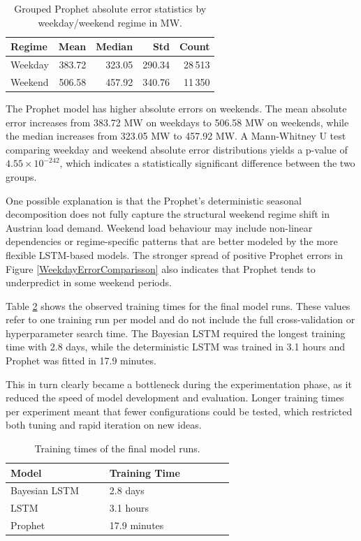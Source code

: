 \documentclass[Master,english,IEEE]{twbook}
\begin{document}
\begin{table}[!htbp]
\centering
\caption{Grouped Prophet absolute error statistics by weekday/weekend regime in MW.}\label{tabWeekdayWeekendErrors}
\begin{tabular}{| l | r | r | r | r |}
\hline
Regime & Mean & Median & Std & Count \\
\hline
Weekday & 383.72 & 323.05 & 290.34 & 28\,513 \\
Weekend & 506.58 & 457.92 & 340.76 & 11\,350 \\
\hline
\end{tabular}
\end{table}

The Prophet model has higher absolute errors on weekends. The mean absolute error increases from 383.72 MW on weekdays to 506.58 MW on weekends, while the median increases from 323.05 MW to 457.92 MW. A Mann-Whitney U test comparing weekday and weekend absolute error distributions yields a p-value of $4.55\times 10^{-242}$, which indicates a statistically significant difference between the two groups.

One possible explanation is that the Prophet's deterministic seasonal decomposition does not fully capture the structural weekend regime shift in Austrian load demand. Weekend load behaviour may include non-linear dependencies or regime-specific patterns that are better modeled by the more flexible LSTM-based models. The stronger spread of positive Prophet errors in Figure \ref{WeekdayErrorComparisson} also indicates that Prophet tends to underpredict in some weekend periods.


Table \ref{tabTrainingTimes} shows the observed training times for the final model runs. These values refer to one training run per model and do not include the full cross-validation or hyperparameter search time. The Bayesian LSTM required the longest training time with 2.8 days, while the deterministic LSTM was trained in 3.1 hours and Prophet was fitted in 17.9 minutes.

This in turn clearly became a bottleneck during the experimentation phase, as it reduced the speed of model development and evaluation. Longer training times per experiment meant that fewer configurations could be tested, which restricted both tuning and rapid iteration on new ideas.

\begin{table}[!htbp]
\centering
\caption{Training times of the final model runs.}
\label{tabTrainingTimes}
\begin{tabular}{| p{0.35\linewidth} | p{0.44\linewidth} |}\hline
Model & Training Time\\\hline
Bayesian LSTM & 2.8 days\\
LSTM & 3.1 hours\\
Prophet & 17.9 minutes\\\hline
\end{tabular}
\end{table}
\end{document}
